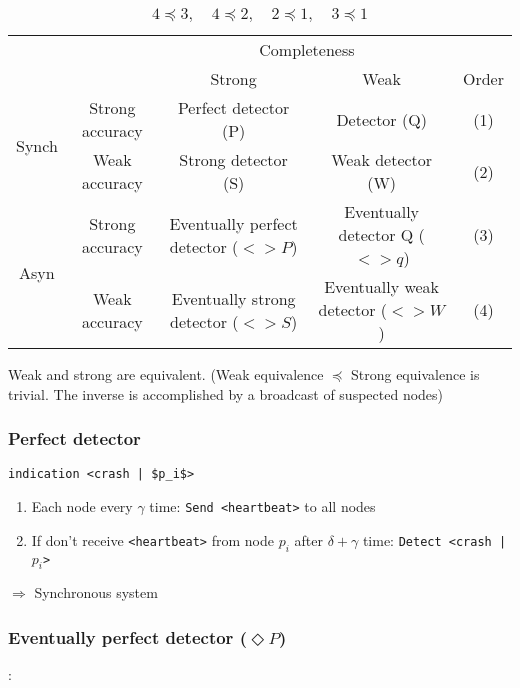 \begin{table}
    \begin{tabular}{c|c|c|c|c}
        & & \multicolumn{2}{c}{ Completeness} & \\
        & & Strong & Weak & Order\\
        \hline

        \multirow{2}{*}{Synch} & Strong accuracy & Perfect detector (P) &
        Detector (Q) & (1) \\
        & Weak accuracy & Strong detector (S) & Weak detector (W) & (2) \\

        \hline

        \multirow{2}{*}{Asyn} & Strong accuracy & Eventually perfect detector
        ($<>P$) & Eventually detector Q ($<>q$) & (3) \\
        & Weak accuracy & Eventually strong detector ($<>S$) & Eventually weak detector
        ($<>W$) & (4) \\
    \end{tabular}
    \caption{$4 \preceq 3, \quad 4 \preceq 2, \quad 2 \preceq 1, \quad 3
    \preceq 1$}
\end{table}

Weak and strong are equivalent. (Weak equivalence $\preceq$ Strong
equivalence is trivial. The inverse is accomplished by a broadcast of
suspected nodes)

\subsubsection{Perfect detector}

\begin{lstlisting}[caption = Perfect detector, mathescape, captionpos=b]
indication <crash | $p_i$>
\end{lstlisting}

\begin{enumerate}
    \item Each node every $\gamma$ time: \texttt{Send <heartbeat>} to all nodes
    \item If don't receive \texttt{<heartbeat>} from node $p_i$ after $\delta + \gamma$ time:
    \texttt{Detect <crash | $p_i$>}
\end{enumerate}

$\Rightarrow$ Synchronous system

\subsubsection{Eventually perfect detector ($\Diamond P$)}:

